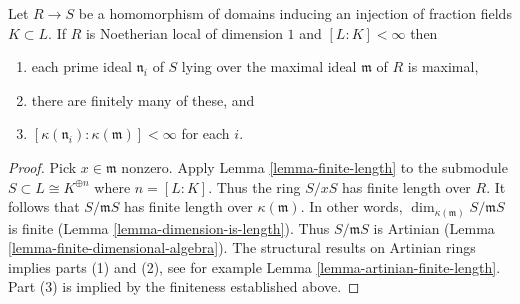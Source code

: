\begin{lemma}
\label{lemma-finite-extension-residue-fields-dimension-1}
Let $R \to S$ be a homomorphism of domains inducing an
injection of fraction fields $K \subset L$. If $R$ is Noetherian
local of dimension $1$ and $[L : K] < \infty$ then
\begin{enumerate}
\item each prime ideal $\mathfrak n_i$ of $S$ lying over
the maximal ideal $\mathfrak m$ of $R$ is maximal,
\item there are finitely many of these, and
\item $[\kappa(\mathfrak n_i) : \kappa(\mathfrak m)] < \infty$ for each $i$.
\end{enumerate}
\end{lemma}

\begin{proof}
Pick $x \in \mathfrak m$ nonzero. Apply Lemma \ref{lemma-finite-length}
to the submodule $S \subset L \cong K^{\oplus n}$ where $n = [L : K]$.
Thus the ring $S/xS$ has finite length over $R$. It follows that
$S/\mathfrak m S$ has finite length over $\kappa(\mathfrak m)$.
In other words, $\dim_{\kappa(\mathfrak m)} S/\mathfrak m S$
is finite (Lemma \ref{lemma-dimension-is-length}). Thus $S/\mathfrak mS$
is Artinian (Lemma \ref{lemma-finite-dimensional-algebra}). The
structural results on Artinian rings implies parts (1) and (2), see
for example Lemma \ref{lemma-artinian-finite-length}.
Part (3) is implied by the finiteness established above.
\end{proof}
